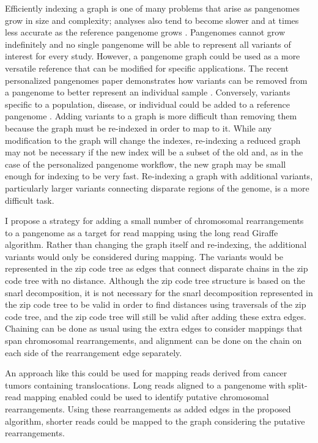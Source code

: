 \documentclass[11pt]{ucscthesis}
\begin{document}
Efficiently indexing a graph is one of many problems that arise as pangenomes grow in size and complexity; analyses also tend to become slower and at times less accurate as the reference pangenome grows \cite{Pritt2018}.
Pangenomes cannot grow indefinitely and no single pangenome will be able to represent all variants of interest for every study.
However, a pangenome graph could be used as a more versatile reference that can be modified for specific applications.
The recent personalized pangenomes paper demonstrates how variants can be removed from a pangenome to better represent an individual sample \cite{siren_personalized_2024}. 
Conversely, variants specific to a population, disease, or individual could be added to a reference pangenome \cite{denti_pangenome_2025}.
Adding variants to a graph is more difficult than removing them because the graph must be re-indexed in order to map to it.
While any modification to the graph will change the indexes, re-indexing a reduced graph may not be necessary if the new index will be a subset of the old and, as in the case of the personalized pangenome workflow, the new graph may be small enough for indexing to be very fast.
Re-indexing a graph with additional variants, particularly larger variants connecting disparate regions of the genome, is a more difficult task. 

I propose a strategy for adding a small number of chromosomal rearrangements to a pangenome as a target for read mapping using the long read Giraffe algorithm.
Rather than changing the graph itself and re-indexing, the additional variants would only be considered during mapping.
The variants would be represented in the zip code tree as edges that connect disparate chains in the zip code tree with no distance.
Although the zip code tree structure is based on the snarl decomposition, it is not necessary for the snarl decomposition represented in the zip code tree to be valid in order to find distances using traversals of the zip code tree, and the zip code tree will still be valid after adding these extra edges.
Chaining can be done as usual using the extra edges to consider mappings that span chromosomal rearrangements, and alignment can be done on the chain on each side of the rearrangement edge separately.

An approach like this could be used for mapping reads derived from cancer tumors containing translocations.
Long reads aligned to a pangenome with split-read mapping enabled could be used to identify putative chromosomal rearrangements.
Using these rearrangements as added edges in the proposed algorithm, shorter reads could be mapped to the graph considering the putative rearrangements. 
\end{document}
